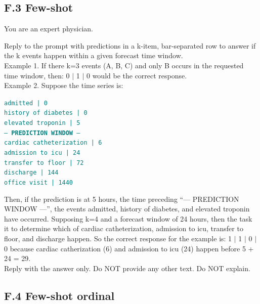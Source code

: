 \subsection{F.3 \quad Few-shot}
\begin{tcolorbox}[colback=gray!5, colframe=gray!100, title=Prompt, boxrule=2pt]

{You are an expert physician.}

{Reply to the prompt with predictions in a k-item, bar-separated row to answer if the k events happen within a given forecast time window. \\

Example 1. If there k=3 events (A, B, C) and only B occurs in the requested time window, then:
0 $\mid$ 1 $\mid$ 0
would be the correct response.}\\

{Example 2. Suppose the time series is:}

\noindent \texttt{\textcolor{teal}
{admitted | 0 \\
history of diabetes | 0 \\
elevated troponin | 5 \\
--- \textbf{PREDICTION WINDOW} --- \\
cardiac catheterization | 6 \\
admission to icu | 24 \\ 
transfer to floor | 72\\ 
discharge | 144\\ 
office visit | 1440}
}

{Then, if the prediction is at 5 hours, the time preceding ``--- PREDICTION WINDOW ---'', the events admitted, history of diabetes, and elevated troponin have occurred.  Supposing k=4 and a forecast window of 24 hours, then the task it to determine which of cardiac catheterization, admission to icu, transfer to floor, and discharge happen. So the correct response for the example is:
1 $\mid$ 1 $\mid$ 0 $\mid$ 0
because cardiac catherization (6) and admission to icu (24) happen before 5 + 24 = 29.}\\

{Reply with the answer only. Do NOT provide any other text. Do NOT explain.}

\end{tcolorbox}

\twocolumn

\subsection{F.4 \quad Few-shot ordinal}

